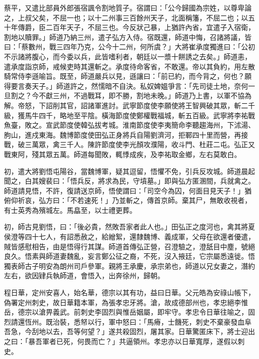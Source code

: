 \begin{pinyinscope}
 蔡平，又遣比部員外郎張宿諷令割地質子。宿謂曰：「公今歸國為宗姓，以尊卑論之，上叔父矣，不屈一也；以十二州事三百餘州天子，北面稱籓，不屈二也；以五十年傳爵，臣二百年天子，不屈三也。今反狀己暴，上猶許內省，宜遣子入宿衛，割地以贖罪。」師道乃納三州，遣子弘方入侍。宿既還，師道中悔，召諸將議，皆曰：「蔡數州，戰三四年乃克，公今十二州，何所虞？」大將崔承度獨進曰：「公初不示諸將腹心，而今委以兵，此皆嗜利者，朝廷以一漿十餅誘之去矣。」師道恚，遣承度詣京師，戒候吏時其還斬之。承度待命客省，不敢還。帝以其負約，用左散騎常侍李遜喻旨。既至，師道嚴兵以見，遜讓曰：「前已約，而今背之，何也？願得要言奏天子。」師道許之，然懦暗不自決。私奴婢媼爭言：「先司徒土地，奈何一旦割之？今不獻三州，不過戰耳，即不勝，割地未晚。」師道乃上書，以軍不協為解。帝怒，下詔削其官，詔諸軍進討。武寧節度使李願使將王智興破其眾，斬二千級，獲馬牛四千，略地至平陰。橫海節度使鄭權戰福城，斬五百級。武寧將李祐戰魚臺，敗之。宣武節度使韓弘拔考城。淮南節度使李夷簡命李聽趨海州，下沭湯、朐山，進戍東海。魏博節度使田弘正身將兵自陽劉濟河，拒鄆四十里而營，再接戰，破三萬眾，禽三千人。陳許節度使李光顏攻濮陽，收斗門、杜莊二屯。弘正又戰東阿，殘其眾五萬。師道每聞敗，輒悸成疾，及李祐取金鄉，左右莫敢白。



 初，遣大將劉悟屯陽谷，當魏博軍，疑其逗留，悟懼不免，引兵反攻城。師道晨起聞之，白其嫂裴曰：「悟兵反，將求為民，守墳墓。」即與弘方匿溷間，兵就禽之。師道請見悟，不許，復請送京師，悟使謂曰：「司空今為囚，何面目見天子！」猶俯仰祈哀，弘方曰：「不若速死！」乃並斬之，傳首京師。棄其尸，無敢收視者，有士英秀為殯城左。馬皛至，以士禮更葬。



 初，師古見劉悟，曰：「後必貴，然敗吾家者此人也。」田弘正之度河也，禽其將夏侯澄等四十七人，有詔悉赦之，給繒絮，還隸魏博、義成軍，父母在欲還者優遣，賊皆感慰相告，由是悟得行其謀。師道首傳弘正營，召澄驗之，澄舐目中塵，號絕良久。悟素與師道妻魏亂，妄言鄭公征之裔，不死，沒入掖廷，它宗屬悉遠徙。悟獨表師古子明安為朗州司戶參軍。親將王承慶，承宗弟也，師道以兄女妻之，潛約左右，欲因肄兵執師道，會悟入，出奔徐州，歸朝。



 程日華，定州安喜人，始名華，德宗以其有功，益曰日華。父元皓為安祿山帳下，偽署定州刺史，故日華籍本軍，為張孝忠牙將。滄，故成德部州也，孝忠絕李惟岳，德宗以滄畀義武。前刺史李固烈與惟岳姻屬，即牢守。孝忠令日華往喻之，固烈請還恆州。既治裝，悉帑以行，軍中怒曰：「馬瘠，士饑死，刺史不棄豪發血阜吾急，今刮地以去，吾等何望？」遂共殺固烈，屠其家。日華驚匿床下，將士迎出之曰：「暴吾軍者已死，何畏而亡？」共逼領州。孝忠亦以日華寬厚，遂假以刺史。




\end{pinyinscope}
